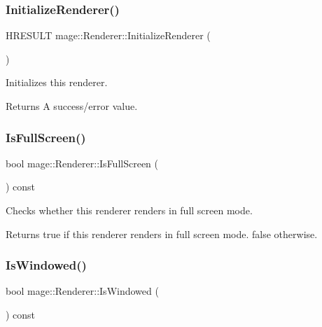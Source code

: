 \subsubsection{\texorpdfstring{Initialize\+Renderer()}{InitializeRenderer()}}
{\footnotesize\ttfamily H\+R\+E\+S\+U\+LT mage\+::\+Renderer\+::\+Initialize\+Renderer (\begin{DoxyParamCaption}{ }\end{DoxyParamCaption})\hspace{0.3cm}{\ttfamily [protected]}}

Initializes this renderer.

\begin{DoxyReturn}{Returns}
A success/error value. 
\end{DoxyReturn}
\hypertarget{classmage_1_1_renderer_a5ae3220e19c68f47a8e4d55e3ced4694}{}\label{classmage_1_1_renderer_a5ae3220e19c68f47a8e4d55e3ced4694} 
\subsubsection{\texorpdfstring{Is\+Full\+Screen()}{IsFullScreen()}}
{\footnotesize\ttfamily bool mage\+::\+Renderer\+::\+Is\+Full\+Screen (\begin{DoxyParamCaption}{ }\end{DoxyParamCaption}) const}

Checks whether this renderer renders in full screen mode.

\begin{DoxyReturn}{Returns}
{\ttfamily true} if this renderer renders in full screen mode. {\ttfamily false} otherwise. 
\end{DoxyReturn}
\hypertarget{classmage_1_1_renderer_a1de1804c1eedae7dc12435a520a10b9c}{}\label{classmage_1_1_renderer_a1de1804c1eedae7dc12435a520a10b9c} 
\subsubsection{\texorpdfstring{Is\+Windowed()}{IsWindowed()}}
{\footnotesize\ttfamily bool mage\+::\+Renderer\+::\+Is\+Windowed (\begin{DoxyParamCaption}{ }\end{DoxyParamCaption}) const}

